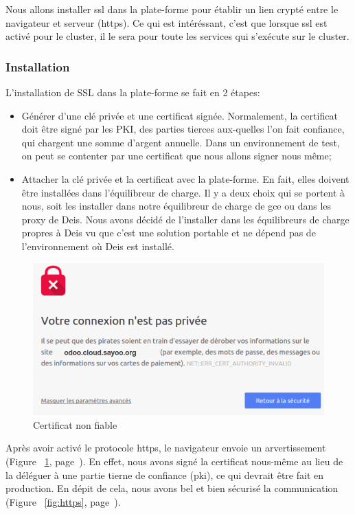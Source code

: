 \begin{onehalfspace}
Nous allons installer \acrshort{ssl} dans la plate-forme pour établir un lien crypté entre le navigateur et serveur (\acrshort{https}). Ce qui est intéréssant, c'est que lorsque \acrshort{ssl} est activé pour le cluster, il le sera pour toute les services qui s'exécute sur le cluster.


\subsubsection{Installation}

L'installation de SSL dans la plate-forme se fait en 2 étapes:
\begin{itemize}
	\item Générer d'une clé privée et une certificat signée. Normalement, la certificat doit être signé par les PKI, des parties tierces aux-quelles l'on fait confiance, qui chargent une somme d'argent annuelle. Dans un environnement de test, on peut se contenter par une certificat que nous allons signer nous même;
	\item Attacher la clé privée et la certificat avec la plate-forme. En fait, elles doivent être installées dans l'équilibreur de charge. Il y a deux choix qui se portent à nous, soit les installer dans notre équilibreur de charge de \acrshort{gce} ou dans les proxy de Deis. Nous avons décidé de l'installer dans les équilibreurs de charge propres à Deis vu que c'est une solution portable et ne dépend pas de l'environnement où Deis est installé.
\end{itemize}

\begin{figure}[H]
\centering
\includegraphics [scale=0.5]{chapitre5/assets/certificat}
\caption{Certificat non fiable}
\label{fig:certificat}
\end{figure}

Après avoir activé le protocole \acrshort{https}, le navigateur envoie un arvertissement (Figure ~\ref{fig:certificat}, page~\pageref{fig:certificat}). En effet, nous avons signé la certificat nous-même au lieu de la déléguer à une partie tierne de confiance (\acrshort{pki}), ce qui devrait être fait en production. En dépit de cela, nous avons bel et bien sécurisé la communication (Figure ~\ref{fig:https}, page~\pageref{fig:https}).


\end{onehalfspace}
